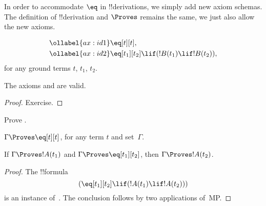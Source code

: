 \documentclass[../../include/open-logic-section]{subfiles}
\begin{document}


In order to accommodate $\eq$ in !!{derivation}s, we simply add new
axiom schemas. The definition of !!{derivation} and $\Proves$ remains
the same, we just also allow the new axioms.

\begin{defn}
\begin{align}
\ollabel{ax:id1} & \eq[t][t], \\
\ollabel{ax:id2} & \eq[t_1][t_2] \lif (!B(t_1) \lif
  !B(t_2)),
\end{align}
for any ground terms $t$, $t_1$, $t_2$.
\end{defn}

\begin{prop}
  The axioms  and  are valid.
\end{prop}

\begin{proof}
  Exercise.
\end{proof}

\begin{prob}
Prove .
\end{prob}

\begin{prop}
 $\Gamma \Proves \eq[t][t]$, for any term $t$ and set~$\Gamma$.
\end{prop}

\begin{prop}
  If $\Gamma \Proves !A(t_1)$ and $\Gamma \Proves
  \eq[t_1][t_2]$, then $\Gamma \Proves !A(t_2)$.
\end{prop}

\begin{proof}
The !!{formula}
\[
(\eq[t_1][t_2] \lif (!A(t_1) \lif !A(t_2)))
\]
is an instance of~. The conclusion follows by two applications
of~MP.
\end{proof}
\end{document}
